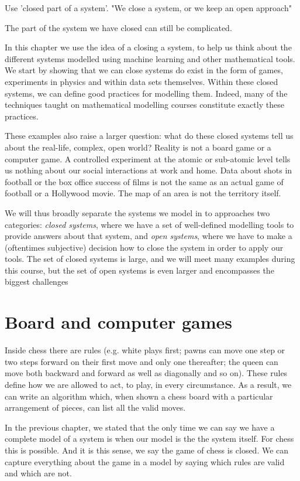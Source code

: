 

Use 'closed part of a system'. "We close a system, or we keep an open approach"

The part of the system we have closed can still be complicated. 

In this chapter we use the idea of a closing a system, to help us think about the different systems modelled using machine learning and other mathematical tools. We start by showing that we can close systems do exist in the form of games, experiments in physics and within data sets themselves. Within these closed systems, we can define good practices for modelling them. Indeed, many of the techniques taught on mathematical modelling courses constitute exactly these practices. 

These examples also raise a larger question: what do these closed systems tell us about the real-life, complex, open world? Reality is not a board game or a computer game. A controlled experiment at the atomic or sub-atomic level tells us nothing about our social interactions at work and home. Data about shots in football or the box office success of films is not the same as an actual game of football or a Hollywood movie. The map of an area is not the territory itself.

We will thus broadly separate the systems we model in to approaches two categories: {\it closed systems}, where we have a set of well-defined modelling tools to provide answers about that system, and {\it open systems}, where we have to make a (oftentimes subjective) decision how to close the system in order to apply our tools. The set of closed systems is large, and we will meet many examples during this course, but the set of open systems is even larger and encompasses the biggest challenges 


\section{Board and computer games}

Inside chess there are rules (e.g. white plays first; pawns can move one step or two steps forward on their first move and only one thereafter; the queen can move both backward and forward as well as diagonally and so on). These rules define how we are allowed to act, to play, in every circumstance. As a result, we can write an algorithm which, when shown a chess board with a particular arrangement of pieces, can list all the valid moves. 

In the previous chapter, we stated that the only time we can say we have a complete model of a system is when our model is the the system itself. For chess this is possible. And it is this sense, we say the game of chess is closed. We can capture everything about the game in a model by saying which rules are valid and which are not.

